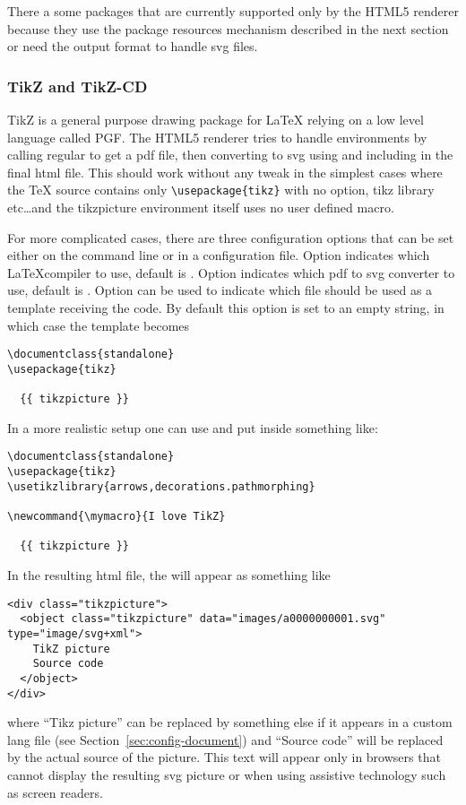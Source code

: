 There a some packages that are currently supported only by the HTML5
renderer because they use the package resources mechanism described in
the next section or need the output format to handle svg files.

\subsubsection{TikZ and TikZ-CD}\label{sec:tikz}

TikZ is a general purpose drawing package for LaTeX relying on a low
level language called PGF. The HTML5 renderer tries to handle
 environments by calling regular
 to get a pdf file, then converting to svg using
 and including in the final html file. This should work
without any tweak in the simplest cases where the TeX source contains
only \verb+\usepackage{tikz}+ with no option, tikz library etc\ldots and the
tikzpicture environment itself uses no user defined macro. 

For more complicated cases, there are three configuration options that
can be set either on the command line or in a configuration file. Option
 indicates which \LaTeX compiler to use,
default is . Option
 indicates which pdf to svg converter
to use, default is . Option
 can be used to indicate which file
should be used as a template receiving the 
code. By default this option is set to an empty string, in which case
the template becomes
\begin{verbatim}
\documentclass{standalone}
\usepackage{tikz}

  {{ tikzpicture }}

\end{verbatim}
In a more realistic setup one can use 
 and put inside  something
like:
\begin{verbatim}
\documentclass{standalone}
\usepackage{tikz}
\usetikzlibrary{arrows,decorations.pathmorphing}

\newcommand{\mymacro}{I love TikZ}

  {{ tikzpicture }}

\end{verbatim}

In the resulting html file, the  will appear as
something like 
\begin{verbatim}
<div class="tikzpicture">
  <object class="tikzpicture" data="images/a0000000001.svg" type="image/svg+xml">
    TikZ picture
    Source code
  </object>
</div>
\end{verbatim}
where ``Tikz picture'' can be replaced by something else if it appears
in a custom lang file (see Section~\ref{sec:config-document}) and
``Source code'' will be replaced by the actual source of the
picture. This text will appear only in browsers that cannot display the
resulting svg picture or when using assistive technology such as screen
readers.

